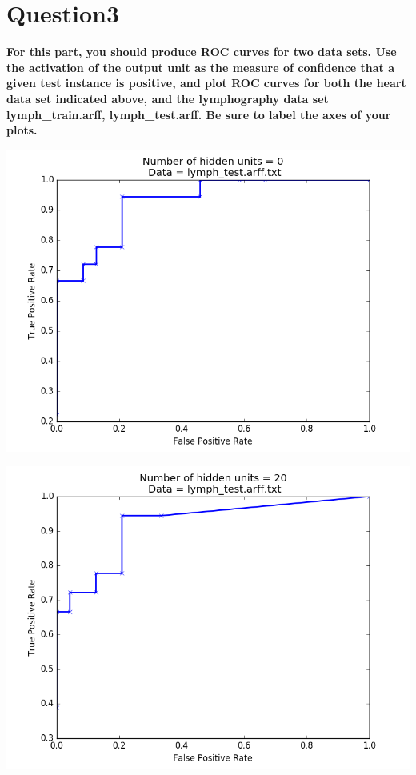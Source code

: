 \documentclass[paper=a4, fontsize=11pt]{scrartcl} %
\numberwithin{equation}{section} %
\numberwithin{figure}{section} %
\numberwithin{table}{section} %
\begin{document}
\newpage
\section*{Question3}
\textbf{For this part, you should produce ROC curves for two data sets. Use the activation of the output unit as the measure of confidence that a given test instance is positive, and plot ROC curves for both the heart data set indicated above, and the lymphography data set lymph\_train.arff, lymph\_test.arff. Be sure to label the axes of your plots.}

\begin{center}
\includegraphics[scale=.5]{pics/roc_noHidden.png}
\end{center}

\begin{center}
\includegraphics[scale=.5]{pics/roc_hidden.png}
\end{center}
\end{document}
